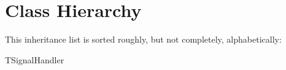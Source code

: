 \section{Class Hierarchy}
This inheritance list is sorted roughly, but not completely, alphabetically\-:\begin{DoxyCompactList}
\item {}
\item {}
\item {}
\item T\-Signal\-Handler\begin{DoxyCompactList}
\item {}
\end{DoxyCompactList}
\item {}
\end{DoxyCompactList}
